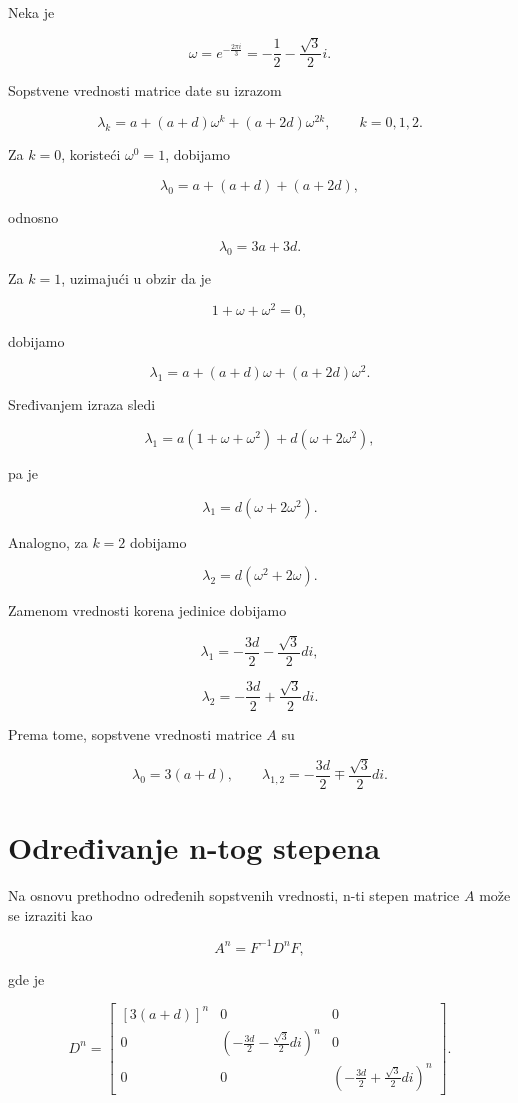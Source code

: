 \documentclass[12pt,a4paper]{report}
\begin{document}
Neka je

\[
\omega=e^{-\frac{2\pi i}{3}}
=-\frac12-\frac{\sqrt{3}}{2}i.
\]

Sopstvene vrednosti matrice date su izrazom

\[
\lambda_k=a+(a+d)\omega^k+(a+2d)\omega^{2k},
\qquad k=0,1,2.
\]

Za \(k=0\), koristeći \(\omega^0=1\), dobijamo

\[
\lambda_0=a+(a+d)+(a+2d),
\]

odnosno

\[
\boxed{\lambda_0=3a+3d}.
\]

Za \(k=1\), uzimajući u obzir da je

\[
1+\omega+\omega^2=0,
\]

dobijamo

\[
\lambda_1=a+(a+d)\omega+(a+2d)\omega^2.
\]

Sređivanjem izraza sledi

\[
\lambda_1=a(1+\omega+\omega^2)
+d(\omega+2\omega^2),
\]

pa je

\[
\boxed{
	\lambda_1=d(\omega+2\omega^2)
}.
\]

Analogno, za \(k=2\) dobijamo

\[
\boxed{
	\lambda_2=d(\omega^2+2\omega)
}.
\]

Zamenom vrednosti korena jedinice dobijamo

\[
\lambda_1=-\frac{3d}{2}-\frac{\sqrt{3}}{2}di,
\]

\[
\lambda_2=-\frac{3d}{2}+\frac{\sqrt{3}}{2}di.
\]

Prema tome, sopstvene vrednosti matrice \(A\) su

\[
\boxed{
	\lambda_0=3(a+d),\qquad
	\lambda_{1,2}=-\frac{3d}{2}\mp\frac{\sqrt{3}}{2}di
}.
\]

\section{Određivanje n-tog stepena}

Na osnovu prethodno određenih sopstvenih vrednosti, n-ti stepen matrice \(A\) može se izraziti kao

\[
A^n=F^{-1}D^nF,
\]

gde je

\[
D^n=
\begin{bmatrix}
	[3(a+d)]^n & 0 & 0\\
	0 & \left(-\frac{3d}{2}-\frac{\sqrt{3}}{2}di\right)^n & 0\\
	0 & 0 & \left(-\frac{3d}{2}+\frac{\sqrt{3}}{2}di\right)^n
\end{bmatrix}.
\]
\end{document}
